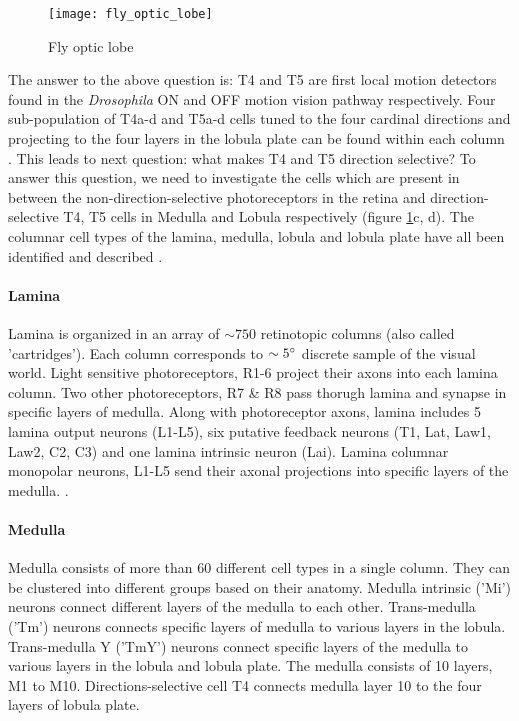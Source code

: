 \begin{figure}
\centering
\hspace*{-1cm} 
\texttt{[image: fly\_optic\_lobe]}
\caption[Fly optic lobe] {Fly optic lobe}
\label{fig:opticlobe}
\end{figure}

The answer to the above question is: T4 and T5 are first local motion detectors found in the \textit{Drosophila} ON and OFF motion vision pathway respectively. Four sub-population of T4a-d and T5a-d cells tuned to the four cardinal directions and projecting to the four layers in the lobula plate can be found within each column \parencite{Maisak2013}. This leads to next question: what makes T4 and T5 direction selective? To answer this question, we need to investigate the cells which are present in between the non-direction-selective photoreceptors in the retina and direction-selective T4, T5 cells in Medulla and Lobula respectively (figure \ref{fig:opticlobe}c, d). The columnar cell types of the lamina, medulla, lobula and lobula plate have all been identified and described \parencite{Fischbach1989, RamonyCajal1915}.  

\paragraph{Lamina}
Lamina is organized in an array of $\sim 750$ retinotopic columns (also called 'cartridges'). Each column corresponds to $\sim 5\degree$ discrete sample of the visual world. Light sensitive photoreceptors, R1-6 project their axons into each lamina column. Two other photoreceptors, R7 \& R8 pass thorugh lamina and synapse in specific layers of medulla. Along with photoreceptor axons, lamina includes 5 lamina output neurons (L1-L5), six putative feedback neurons (T1, Lat, Law1, Law2, C2, C3) and one lamina intrinsic neuron (Lai). Lamina columnar monopolar neurons, L1-L5 send their axonal projections into specific layers of the medulla. \parencite{Fischbach1989, Tuthill2013}. 

\paragraph{Medulla}
Medulla consists of more than 60 different cell types in a single column. They can be clustered into different groups based on their anatomy. Medulla intrinsic ('Mi') neurons connect different layers of the medulla to each other. Trans-medulla ('Tm') neurons connects specific layers of medulla to various layers in the lobula. Trans-medulla Y ('TmY') neurons connect specific layers of the medulla to various layers in the lobula and lobula plate. The medulla consists of 10 layers, M1 to M10. Directions-selective cell T4 connects medulla layer 10 to the four layers of lobula plate.

